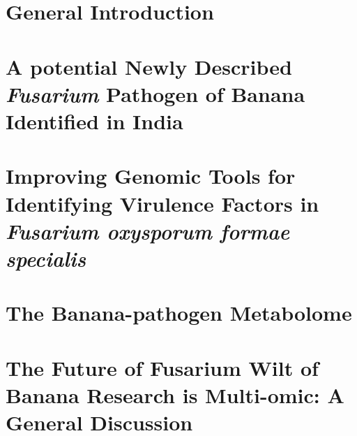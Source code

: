 \documentclass[11pt, a4paper, titles]{report}  %
\begin{document}
\setcounter{secnumdepth}{2}


\renewcommand{\arraystretch}{1.5} %
\pagestyle{fancy} 

\chapter{General Introduction}\label{Chap1}
    
    
\chapter{A potential Newly Described \textit{Fusarium} Pathogen of Banana Identified in India}\label{Chap2}
    
    
\chapter{Improving Genomic Tools for Identifying Virulence Factors in  \textit{Fusarium oxysporum formae specialis}}\label{Chap3}
     
    
\chapter{The Banana-pathogen Metabolome}\label{Chap4}
     

\chapter{The Future of Fusarium Wilt of Banana Research is Multi-omic: A General Discussion}\label{Chap5}
    


\end{document}
